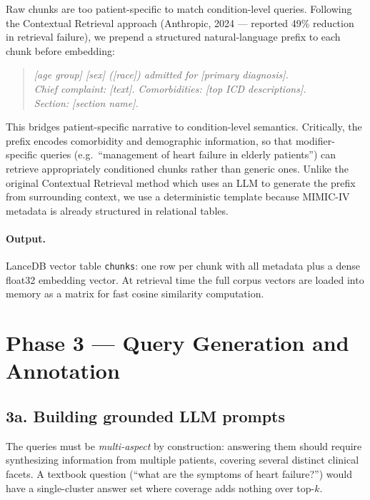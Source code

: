 \documentclass[11pt,a4paper]{article}
\begin{document}
Raw chunks are too patient-specific to match condition-level queries. Following the Contextual Retrieval approach (Anthropic, 2024 — reported 49\% reduction in retrieval failure), we prepend a structured natural-language prefix to each chunk before embedding:

\begin{quote}
	\textit{[age group] [sex] ([race]) admitted for [primary diagnosis].\\
	Chief complaint: [text]. Comorbidities: [top ICD descriptions].\\
	Section: [section name].}
\end{quote}

This bridges patient-specific narrative to condition-level semantics. Critically, the prefix encodes comorbidity and demographic information, so that modifier-specific queries (e.g.\ ``management of heart failure in elderly patients'') can retrieve appropriately conditioned chunks rather than generic ones. Unlike the original Contextual Retrieval method which uses an LLM to generate the prefix from surrounding context, we use a deterministic template because MIMIC-IV metadata is already structured in relational tables.

\paragraph{Output.} LanceDB vector table \texttt{chunks}: one row per chunk with all metadata plus a dense float32 embedding vector. At retrieval time the full corpus vectors are loaded into memory as a matrix for fast cosine similarity computation.

\section{Phase 3 --- Query Generation and Annotation}

\subsection{3a. Building grounded LLM prompts}

The queries must be \emph{multi-aspect} by construction: answering them should require synthesizing information from multiple patients, covering several distinct clinical facets. A textbook question (``what are the symptoms of heart failure?'') would have a single-cluster answer set where coverage adds nothing over top-$k$.
\end{document}

